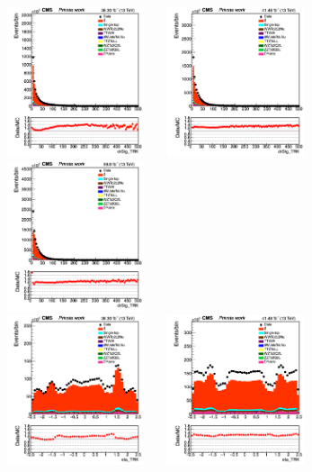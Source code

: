 \documentclass{cernatlasnote}
\begin{document}
 \begin{figure}[htp]
\centering
\includegraphics[width=4.6cm, height=4.4cm]{images/emu_channel/2016/16_Range_0pt2_1pt8/track_drSig_TRK_Linear.png}
\includegraphics[width=4.6cm, height=4.4cm]{images/emu_channel/2017/17_Range_0pt2_1pt8/track_drSig_TRK_Linear.png}
 \includegraphics[width=4.6cm, height=4.4cm]{images/emu_channel/2018/18_Range_0pt2_1pt8/track_drSig_TRK_Linear.png}\\
 \includegraphics[width=4.6cm, height=4.4cm]{images/emu_channel/2016/16_Range_0pt2_1pt8/track_eta_TRK_Linear.png}
\includegraphics[width=4.6cm, height=4.4cm]{images/emu_channel/2017/17_Range_0pt2_1pt8/track_eta_TRK_Linear.png}

\end{figure}
\end{document}
